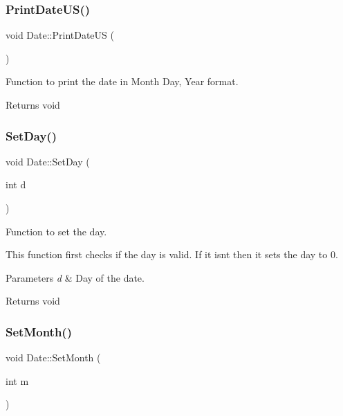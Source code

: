 \subsubsection{\texorpdfstring{PrintDateUS()}{PrintDateUS()}}
{\footnotesize\ttfamily void Date\+::\+Print\+Date\+US (\begin{DoxyParamCaption}{ }\end{DoxyParamCaption})\hspace{0.3cm}{\ttfamily [inline]}}



Function to print the date in Month Day, Year format. 

\begin{DoxyReturn}{Returns}
void 
\end{DoxyReturn}
\mbox{\label{class_date_ab2d0573c89abb758c92b429874ad9ae2}} 
\subsubsection{\texorpdfstring{SetDay()}{SetDay()}}
{\footnotesize\ttfamily void Date\+::\+Set\+Day (\begin{DoxyParamCaption}\item[{int}]{d }\end{DoxyParamCaption})\hspace{0.3cm}{\ttfamily [inline]}}



Function to set the day. 

This function first checks if the day is valid. If it isn\textquotesingle{}t then it sets the day to 0.


\begin{DoxyParams}{Parameters}
{\em d} & Day of the date.\\
\hline
\end{DoxyParams}
\begin{DoxyReturn}{Returns}
void 
\end{DoxyReturn}
\mbox{\label{class_date_ae47ff4dbe38076b995703ecb4aa5c602}} 
\subsubsection{\texorpdfstring{SetMonth()}{SetMonth()}}
{\footnotesize\ttfamily void Date\+::\+Set\+Month (\begin{DoxyParamCaption}\item[{int}]{m }\end{DoxyParamCaption})\hspace{0.3cm}{\ttfamily [inline]}}



